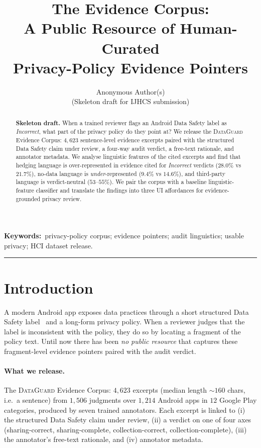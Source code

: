\documentclass[11pt,a4paper]{article}
\title{\bfseries The Evidence Corpus: \\
A Public Resource of Human-Curated \\
Privacy-Policy Evidence Pointers}
\author{Anonymous Author(s)\\\small (Skeleton draft for IJHCS submission)}
\date{}
\newcommand{\dataguard}{\textsc{DataGuard}}
\begin{document}
\maketitle

\begin{abstract}
\noindent\textbf{Skeleton draft.}
When a trained reviewer flags an Android Data Safety label as
\emph{Incorrect}, what part of the privacy policy do they point at?
We release the \dataguard{} Evidence Corpus: $4{,}623$ sentence-level
evidence excerpts paired with the structured Data Safety claim under
review, a four-way audit verdict, a free-text rationale, and annotator
metadata. We analyse linguistic features of the cited excerpts and find
that hedging language is over-represented in evidence cited for
\emph{Incorrect} verdicts ($28.0\%$ vs $21.7\%$), no-data language is
\emph{under}-represented ($9.4\%$ vs $14.6\%$), and third-party language
is verdict-neutral ($53$--$55\%$). We pair the corpus with a baseline
linguistic-feature classifier and translate the findings into three UI
affordances for evidence-grounded privacy review.
\end{abstract}

\noindent\textbf{Keywords:}\ privacy-policy corpus; evidence pointers;
audit linguistics; usable privacy; HCI dataset release.

\bigskip\hrule\bigskip

\section{Introduction}
A modern Android app exposes data practices through a short structured
Data Safety label~\citep{googledatasafety2022} and a long-form privacy
policy. When a reviewer judges that the label is inconsistent with the
policy, they do so by locating a fragment of the policy text. Until now
there has been \emph{no public resource} that captures these
fragment-level evidence pointers paired with the audit verdict.

\paragraph{What we release.} The \dataguard{} Evidence Corpus:
$4{,}623$ excerpts (median length $\sim 160$ chars, i.e.\ a sentence)
from $1{,}506$ judgments over $1{,}214$ Android apps in $12$ Google Play
categories, produced by seven trained annotators. Each excerpt is
linked to (i) the structured Data Safety claim under review,
(ii) a verdict on one of four axes (sharing-correct,
sharing-complete, collection-correct, collection-complete),
(iii) the annotator's free-text rationale, and (iv) annotator metadata.
\end{document}
